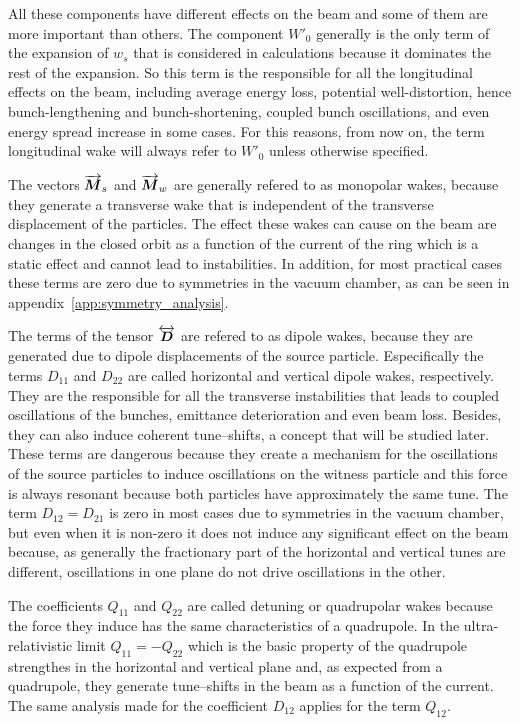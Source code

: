     All these components have different effects on the beam and some of them are more important than others. The component $W'_0$ generally is the only term of the expansion of $w_s$ that is considered in calculations because it dominates the rest of the expansion. So this term is the responsible for all the longitudinal effects on the beam, including average energy loss, potential well-distortion, hence bunch-lengthening and bunch-shortening, coupled bunch oscillations, and even energy spread increase in some cases. For this reasons, from now on, the term longitudinal wake will always refer to $W'_0$ unless otherwise specified.

    The vectors $\overrightarrow{\boldsymbol{M}}_s$ and $\overrightarrow{\boldsymbol{M}}_w$ are generally refered to as monopolar wakes, because they generate a transverse wake that is independent of the transverse displacement of the particles. The effect these wakes can cause on the beam are changes in the closed orbit as a function of the current of the ring which is a static effect and cannot lead to instabilities. In addition, for most practical cases these terms are zero due to symmetries in the vacuum chamber, as can be seen in appendix~\ref{app:symmetry_analysis}.

    The terms of the tensor $\overleftrightarrow{\boldsymbol{D}}$ are refered to as dipole wakes, because they are generated due to dipole displacements of the source particle. Especifically the terms $D_{11}$ and $D_{22}$ are called horizontal and vertical dipole wakes, respectively. They are the responsible for all the transverse instabilities that leads to coupled oscillations of the bunches, emittance deterioration and even beam loss. Besides, they can also induce coherent tune--shifts, a concept that will be studied later. These terms are dangerous because they create a mechanism for the oscillations of the source particles to induce oscillations on the witness particle and this force is always resonant because both particles have approximately the same tune. The term $D_{12}=D_{21}$ is zero in most cases due to symmetries in the vacuum chamber, but even when it is non-zero it does not induce any significant effect on the beam because, as generally the fractionary part of the horizontal and vertical tunes are different, oscillations in one plane do not drive oscillations in the other.

    The coefficients $Q_{11}$ and $Q_{22}$ are called detuning or quadrupolar wakes because the force they induce has the same characteristics of a quadrupole. In the ultra-relativistic limit $Q_{11}=-Q_{22}$ which is the basic property of the quadrupole strengthes in the horizontal and vertical plane and, as expected from a quadrupole, they generate tune--shifts in the beam as a function of the current. The same analysis made for the coefficient $D_{12}$ applies for the term $Q_{12}$.

